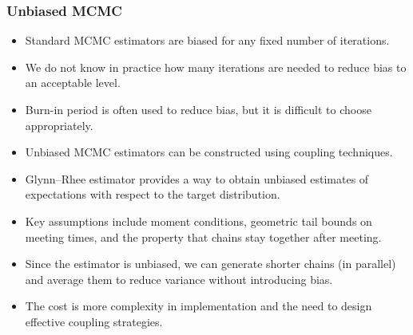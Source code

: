 \documentclass[aspectratio=169]{beamer}
\begin{document}
\begin{frame}
	\frametitle{Unbiased MCMC}

	\begin{itemize}
		\item Standard MCMC estimators are biased for any fixed number of iterations.
		\item We do not know in practice how many iterations are needed to reduce bias to an acceptable level.
		\item Burn-in period is often used to reduce bias, but it is difficult to choose appropriately.
		\item Unbiased MCMC estimators can be constructed using coupling techniques.
		\item Glynn--Rhee estimator provides a way to obtain unbiased estimates of expectations with respect to the target distribution.
		\item Key assumptions include moment conditions, geometric tail bounds on meeting times, and the property that chains stay together after meeting.
		\item Since the estimator is unbiased, we can generate shorter chains (in parallel) and average them to reduce variance without introducing bias.
		\item The cost is more complexity in implementation and the need to design effective coupling strategies.
	\end{itemize}
\end{frame}
\end{document}
